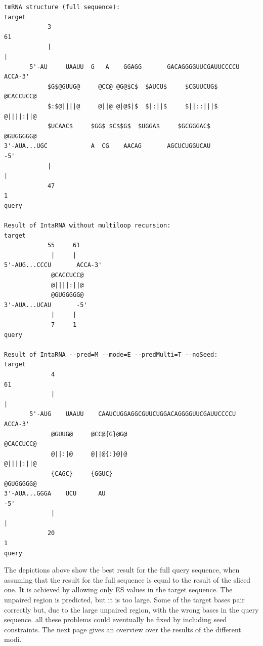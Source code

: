 \documentclass[11pt,a4paper]{report}
\begin{document}
\begin{lstlisting}[style=base]
tmRNA structure (full sequence):
target
            3                                                          61
            |                                                          |
       5'-AU     UAAUU  G   A    GGAGG       GACAGGGGUUCGAUUCCCCU       ACCA-3'
            $G$@GUUG@     @CC@ @G@$C$  $AUCU$     $CGUUCUG$         	         @CACCUCC@
            $:$@||||@     @||@ @|@$|$  $|:||$     $||::|||$    	         @||||:||@
            $UCAAC$     $GG$ $C$$G$  $UGGA$     $GCGGGAC$    	         @GUGGGGG@
3'-AUA...UGC            A  CG    AACAG       AGCUCUGGUCAU               -5'
            |                                                          |
            47                                                         1
query

Result of IntaRNA without multiloop recursion:
target
            55     61
             |     |
5'-AUG...CCCU       ACCA-3'
             @CACCUCC@
             @||||:||@
             @GUGGGGG@
3'-AUA...UCAU       -5'
             |     |
             7     1
query

Result of IntaRNA --pred=M --mode=E --predMulti=T --noSeed:
target
             4                                                        61
             |                                                        |
       5'-AUG    UAAUU    CAAUCUGGAGGCGUUCUGGACAGGGGUUCGAUUCCCCU       ACCA-3'
             @GUUG@     @CC@{G}@G@                                      @CACCUCC@
             @||:|@     @||@{:}@|@                                      @||||:||@
             {CAGC}     {GGUC}                                      @GUGGGGG@
3'-AUA...GGGA    UCU      AU                                           -5'
             |                                                        |
            20                                                        1
query
\end{lstlisting}
The depictions above show the best result for the full query sequence, when assuming that the result for the full sequence is equal to the result of the sliced one. It is achieved by allowing only ES values in the target sequence. The unpaired region is predicted, but it is too large. Some of the target bases pair correctly but, due to the large unpaired region, with the wrong bases in the query sequence. all these problems could eventually be fixed by including seed constraints. The next page gives an overview over the results of the different modi.
\newpage
\end{document}
